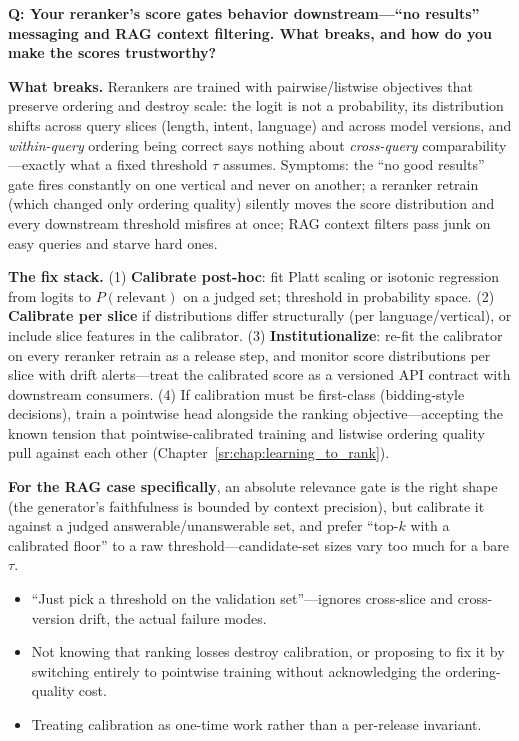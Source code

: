 \begin{interviewq}
\textbf{Q: Your reranker's score gates behavior downstream---``no results'' messaging and RAG context filtering. What breaks, and how do you make the scores trustworthy?}

 \quad {} \quad \badgefreq{\freqlow}

\stronganswer

\textbf{What breaks.} Rerankers are trained with pairwise/listwise objectives that preserve ordering and destroy scale: the logit is not a probability, its distribution shifts across query slices (length, intent, language) and across model versions, and \textit{within-query} ordering being correct says nothing about \textit{cross-query} comparability---exactly what a fixed threshold $\tau$ assumes. Symptoms: the ``no good results'' gate fires constantly on one vertical and never on another; a reranker retrain (which changed only ordering quality) silently moves the score distribution and every downstream threshold misfires at once; RAG context filters pass junk on easy queries and starve hard ones.

\textbf{The fix stack.} (1) \textbf{Calibrate post-hoc}: fit Platt scaling or isotonic regression from logits to $P(\text{relevant})$ on a judged set; threshold in probability space. (2) \textbf{Calibrate per slice} if distributions differ structurally (per language/vertical), or include slice features in the calibrator. (3) \textbf{Institutionalize}: re-fit the calibrator on every reranker retrain as a release step, and monitor score distributions per slice with drift alerts---treat the calibrated score as a versioned API contract with downstream consumers. (4) If calibration must be first-class (bidding-style decisions), train a pointwise head alongside the ranking objective---accepting the known tension that pointwise-calibrated training and listwise ordering quality pull against each other (Chapter~\ref{sr:chap:learning_to_rank}).

\textbf{For the RAG case specifically}, an absolute relevance gate is the right shape (the generator's faithfulness is bounded by context precision), but calibrate it against a judged answerable/unanswerable set, and prefer ``top-$k$ with a calibrated floor'' to a raw threshold---candidate-set sizes vary too much for a bare $\tau$.

\redflags
\begin{itemize}
    \item ``Just pick a threshold on the validation set''---ignores cross-slice and cross-version drift, the actual failure modes.
    \item Not knowing that ranking losses destroy calibration, or proposing to fix it by switching entirely to pointwise training without acknowledging the ordering-quality cost.
    \item Treating calibration as one-time work rather than a per-release invariant.
\end{itemize}


\end{interviewq}
